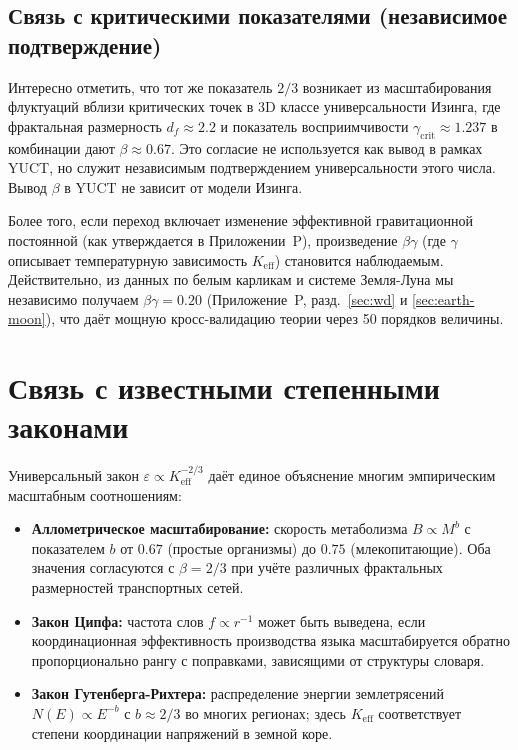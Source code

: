 \documentclass[12pt]{article}
\newcommand{\Keff}{K_{\mathrm{eff}}}
\newcommand{\eps}{\varepsilon}
\begin{document}
	\subsection*{Связь с критическими показателями (независимое подтверждение)}
	Интересно отметить, что тот же показатель \(2/3\) возникает из масштабирования флуктуаций вблизи критических точек в 3D классе универсальности Изинга, где фрактальная размерность \(d_f \approx 2.2\) и показатель восприимчивости \(\gamma_{\mathrm{crit}} \approx 1.237\) в комбинации дают \(\beta \approx 0.67\). Это согласие не используется как вывод в рамках YUCT, но служит независимым подтверждением универсальности этого числа. Вывод \(\beta\) в YUCT не зависит от модели Изинга.
	
	Более того, если переход включает изменение эффективной гравитационной постоянной (как утверждается в Приложении~P), произведение \(\beta\gamma\) (где \(\gamma\) описывает температурную зависимость \(K_{\mathrm{eff}}\)) становится наблюдаемым. Действительно, из данных по белым карликам и системе Земля-Луна мы независимо получаем \(\beta\gamma = 0.20\) (Приложение~P, разд.~\ref{sec:wd} и \ref{sec:earth-moon}), что даёт мощную кросс-валидацию теории через 50 порядков величины.
	
	\section{Связь с известными степенными законами}
	\label{sec:connections}
	
	Универсальный закон \(\eps \propto \Keff^{-2/3}\) даёт единое объяснение многим эмпирическим масштабным соотношениям:
	
	\begin{itemize}
		\item \textbf{Аллометрическое масштабирование:} скорость метаболизма \(B \propto M^{b}\) с показателем \(b\) от \(0.67\) (простые организмы) до \(0.75\) (млекопитающие). Оба значения согласуются с \(\beta = 2/3\) при учёте различных фрактальных размерностей транспортных сетей.
		\item \textbf{Закон Ципфа:} частота слов \(f \propto r^{-1}\) может быть выведена, если координационная эффективность производства языка масштабируется обратно пропорционально рангу с поправками, зависящими от структуры словаря.
		\item \textbf{Закон Гутенберга-Рихтера:} распределение энергии землетрясений \(N(E) \propto E^{-b}\) с \(b \approx 2/3\) во многих регионах; здесь \(\Keff\) соответствует степени координации напряжений в земной коре.
	\end{itemize}
	
\end{document}
